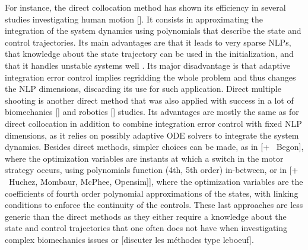 For instance, the direct collocation method has shown its efficiency in several studies investigating human motion [\addref{}]. 
It consists in approximating the integration of the system dynamics using polynomials that describe the state and control trajectories.
Its main advantages are that it leads to very sparse NLPs, that knowledge about the state trajectory can be used in the initialization, and that it handles unstable systems well \cite{diehl2006fast}. 
Its major disadvantage is that adaptive integration error control implies regridding the whole problem and thus changes the NLP dimensions, discarding its use for such application.
Direct multiple shooting is another direct method that was also applied with success in a lot of biomechanics [\addref] and robotics [\addref] studies.
Its advantages are mostly the same as for direct collocation in addition to combine integration error control with fixed NLP dimensions, as it relies on possibly adaptive ODE solvers to integrate the system dynamics.
Besides direct methods, simpler choices can be made, as in \cite{yeadon2000mechanics} [+ \addref\ Begon], where the optimization variables are instants at which a switch in the motor strategy occurs, using polynomials function (4th, 5th order) in-between, or in \cite{leboeuf2006energetic} [+ \addref\  Huchez, Mombaur, McPhee, Opensim]], where the optimization variables are the coefficients of fourth order polynomial approximations of the states, with linking conditions to enforce the continuity of the controls. 
These last approaches are less generic than the direct methods as they either require a knowledge about the state and control trajectories that one often does not have when investigating complex biomechanics issues or [discuter les méthodes type leboeuf]. 


